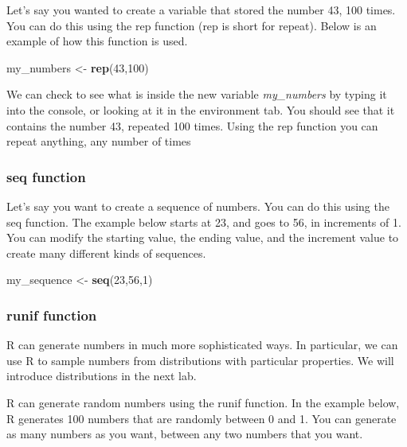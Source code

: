 \documentclass[]{book}
\newenvironment{Shaded}{\begin{snugshade}}{\end{snugshade}}
\newcommand{\KeywordTok}[1]{\textcolor[rgb]{0.13,0.29,0.53}{\textbf{{#1}}}}
\newcommand{\DecValTok}[1]{\textcolor[rgb]{0.00,0.00,0.81}{{#1}}}
\newcommand{\StringTok}[1]{\textcolor[rgb]{0.31,0.60,0.02}{{#1}}}
\newcommand{\NormalTok}[1]{{#1}}
\theoremstyle{definition}
\theoremstyle{definition}
\theoremstyle{definition}
\theoremstyle{remark}
\begin{document}
Let's say you wanted to create a variable that stored the number 43, 100
times. You can do this using the rep function (rep is short for repeat).
Below is an example of how this function is used.

\begin{Shaded}
\begin{Highlighting}[]
\NormalTok{my_numbers <-}\StringTok{ }\KeywordTok{rep}\NormalTok{(}\DecValTok{43}\NormalTok{,}\DecValTok{100}\NormalTok{)}
\end{Highlighting}
\end{Shaded}

We can check to see what is inside the new variable \emph{my\_numbers}
by typing it into the console, or looking at it in the environment tab.
You should see that it contains the number 43, repeated 100 times. Using
the rep function you can repeat anything, any number of times

\subsubsection{seq function}\label{seq-function}

Let's say you want to create a sequence of numbers. You can do this
using the seq function. The example below starts at 23, and goes to 56,
in increments of 1. You can modify the starting value, the ending value,
and the increment value to create many different kinds of sequences.

\begin{Shaded}
\begin{Highlighting}[]
\NormalTok{my_sequence <-}\StringTok{ }\KeywordTok{seq}\NormalTok{(}\DecValTok{23}\NormalTok{,}\DecValTok{56}\NormalTok{,}\DecValTok{1}\NormalTok{)}
\end{Highlighting}
\end{Shaded}

\subsubsection{runif function}\label{runif-function}

R can generate numbers in much more sophisticated ways. In particular,
we can use R to sample numbers from distributions with particular
properties. We will introduce distributions in the next lab.

R can generate random numbers using the runif function. In the example
below, R generates 100 numbers that are randomly between 0 and 1. You
can generate as many numbers as you want, between any two numbers that
you want.
\end{document}
